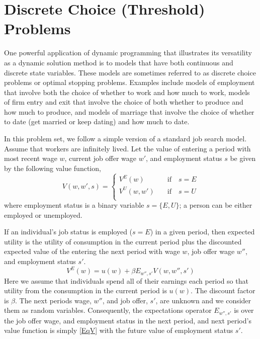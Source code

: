 

\section*{Discrete Choice (Threshold) Problems}\label{SecDiscrChoice}

One powerful application of dynamic programming that illustrates its versatility as a dynamic solution method is to models that have both continuous and discrete state variables. These models are sometimes referred to as discrete choice problems or optimal stopping problems.  Examples include models of employment that involve both the choice of whether to work and how much to work, models of firm entry and exit that involve the choice of both whether to produce and how much to produce, and models of marriage that involve the choice of whether to date (get married or keep dating) and how much to date.

In this problem set, we follow a simple version of a standard job search model.  Assume that workers are infinitely lived. Let the value of entering a period with most recent wage $w$, current job offer wage $w'$, and employment status $s$ be given by the following value function,
\begin{equation}\label{EqV}
   V(w,w',s) = \begin{cases}
                  V^E(w)    \quad&\text{if}\quad s = E \\
                  V^U(w,w') \quad&\text{if}\quad s = U \\
               \end{cases}
\end{equation}
where employment status is a binary variable $s=\{E,U\}$; a person can be either employed or unemployed.

If an individual's job status is employed ($s = E$) in a given period, then expected utility is the utility of consumption in the current period plus the discounted expected value of the entering the next period with wage $w$, job offer wage $w''$, and employment status $s'$.
\begin{equation}\label{EqVe1}
   V^E(w) = u(w) + \beta E_{w'',s'}V(w,w'',s')
\end{equation}
Here we assume that individuals spend all of their earnings each period so that utility from the consumption in the current period is $u(w)$.  The discount factor is $\beta$.  The next periods wage, $w''$, and job offer, $s'$, are unknown and we consider them as random variables.  Consequently, the expectations operator $E_{w'',s'}$ is over the job offer wage, and employment status in the next period, and next period's value function is simply \eqref{EqV} with the future value of employment status $s'$.

